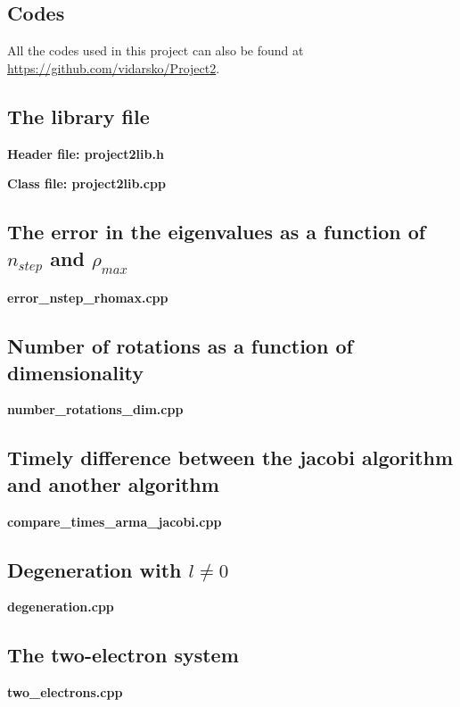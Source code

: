 \documentclass[a4paper,10pt,english]{article}
\numberwithin{figure}{subsection}
\numberwithin{table}{subsection}
\numberwithin{equation}{subsection}
\begin{document}
\begin{appendices}
\newpage
\section{Codes}
All the codes used in this project can also be found at 
\url{https://github.com/vidarsko/Project2}. 

\subsection{The library file}

\textbf{Header file: project2lib.h}


\newpage
\textbf{Class file: project2lib.cpp}


\newpage
\subsection{The error in the eigenvalues as a function of $n_{step}$ and $\rho_{max}$}
\label{sec:error_nstep_rhomax.cpp}
\textbf{error\_nstep\_rhomax.cpp}


\newpage
\subsection{Number of rotations as a function of dimensionality}
\label{sec:number_rotations_dim.cpp}
\textbf{number\_rotations\_dim.cpp}


\newpage
\subsection{Timely difference between the jacobi algorithm and another algorithm}
\label{sec:compare_times_arma_jacobi.cpp}
\textbf{compare\_times\_arma\_jacobi.cpp}


\newpage
\subsection{Degeneration with $l\neq 0$}
\label{sec:degeneration.cpp}
\textbf{degeneration.cpp}


\newpage
\subsection{The two-electron system}
\label{sec:two_electrons.cpp}
\textbf{two\_electrons.cpp}


\end{appendices}
\clearpage
{}

\end{document}
